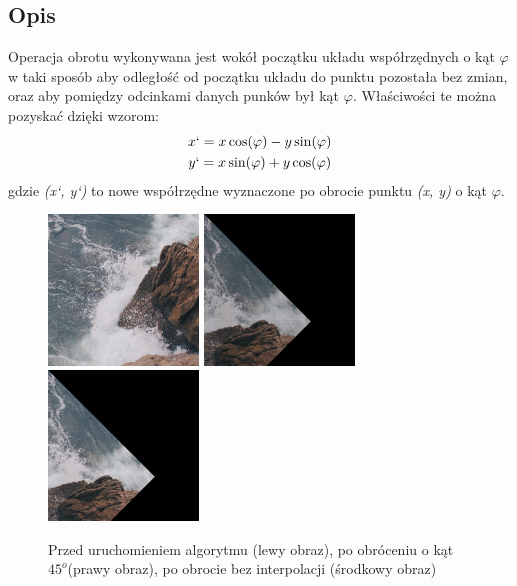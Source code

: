 \documentclass[a4paper,12pt]{book}
\begin{document}
\subsection*{Opis}
Operacja obrotu wykonywana jest wokół początku układu współrzędnych o kąt $\varphi$ w taki sposób aby odległość od początku układu do punktu pozostała bez zmian, oraz aby pomiędzy odcinkami danych punków był kąt $\varphi$. Właściwości te można pozyskać dzięki wzorom: 
\begin{gather}
	x` = x\cos(\varphi) - y\sin(\varphi) \\
	y` = x\sin(\varphi) + y\cos(\varphi)
\end{gather}
gdzie \textit{(x`, y`)} to nowe współrzędne wyznaczone po obrocie punktu \textit{(x, y)} o kąt $\varphi$. 
\begin{figure}[H]
	\caption{Przed uruchomieniem algorytmu (lewy obraz), po obróceniu o kąt $45^o$(prawy obraz), po obrocie bez interpolacji (środkowy obraz)}
	\includegraphics[width=4cm, height=4cm]{sea-unmodified.jpg}
	\includegraphics[width=4cm, height=4cm]{sea-rotation-without-interpolation.png}
	\includegraphics[width=4cm, height=4cm]{sea-rotation.png}
\end{figure}
\end{document}
